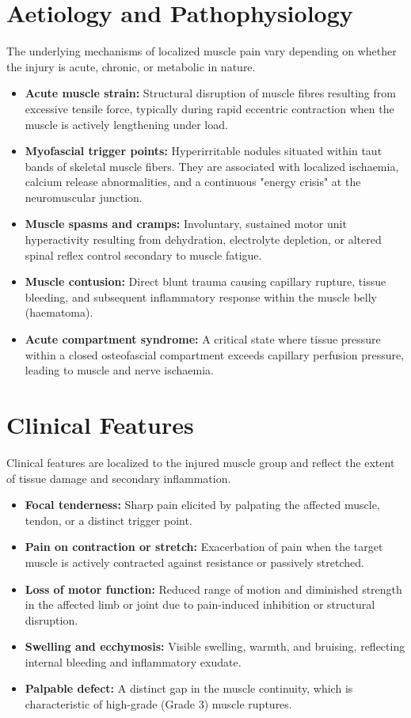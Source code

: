\section*{Aetiology and Pathophysiology}
The underlying mechanisms of localized muscle pain vary depending on whether the injury is acute, chronic, or metabolic in nature.
\begin{itemize}
    \item \textbf{Acute muscle strain:} Structural disruption of muscle fibres resulting from excessive tensile force, typically during rapid eccentric contraction when the muscle is actively lengthening under load.
    \item \textbf{Myofascial trigger points:} Hyperirritable nodules situated within taut bands of skeletal muscle fibers. They are associated with localized ischaemia, calcium release abnormalities, and a continuous "energy crisis" at the neuromuscular junction.
    \item \textbf{Muscle spasms and cramps:} Involuntary, sustained motor unit hyperactivity resulting from dehydration, electrolyte depletion, or altered spinal reflex control secondary to muscle fatigue.
    \item \textbf{Muscle contusion:} Direct blunt trauma causing capillary rupture, tissue bleeding, and subsequent inflammatory response within the muscle belly (haematoma).
    \item \textbf{Acute compartment syndrome:} A critical state where tissue pressure within a closed osteofascial compartment exceeds capillary perfusion pressure, leading to muscle and nerve ischaemia.
\end{itemize}

\section*{Clinical Features}
Clinical features are localized to the injured muscle group and reflect the extent of tissue damage and secondary inflammation.
\begin{itemize}
    \item \textbf{Focal tenderness:} Sharp pain elicited by palpating the affected muscle, tendon, or a distinct trigger point.
    \item \textbf{Pain on contraction or stretch:} Exacerbation of pain when the target muscle is actively contracted against resistance or passively stretched.
    \item \textbf{Loss of motor function:} Reduced range of motion and diminished strength in the affected limb or joint due to pain-induced inhibition or structural disruption.
    \item \textbf{Swelling and ecchymosis:} Visible swelling, warmth, and bruising, reflecting internal bleeding and inflammatory exudate.
    \item \textbf{Palpable defect:} A distinct gap in the muscle continuity, which is characteristic of high-grade (Grade 3) muscle ruptures.
\end{itemize}

